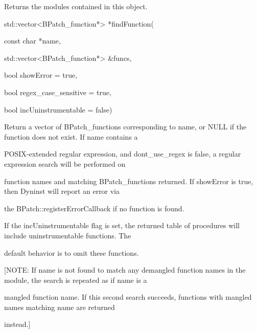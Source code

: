 {{{{

Returns the modules contained in this object.}



{

std::vector<BPatch_function*> *findFunction(}



{

const char *name,}



{

std::vector<BPatch_function*> &funcs,}



{

bool showError = true,}



{

bool regex_case_sensitive = true,}



{

bool incUninstrumentable = false)}



{

Return a vector of BPatch_functions corresponding to name, or NULL if the function does not exist. If name contains a

POSIX-extended regular expression, and dont_use_regex is false, a regular expression search will be performed on

function names and matching BPatch_functions returned. If showError is true, then Dyninst will report an error via

the BPatch::registerErrorCallback if no function is found.}



{

If the incUninstrumentable flag is set, the returned table of procedures will include uninstrumentable functions. The

default behavior is to omit these functions.}



{

[NOTE: If name is not found to match any demangled function names in the module, the search is repeated as if name is a

mangled function name. If this second search succeeds, functions with mangled names matching name are returned

instead.]}



{

}}}}
